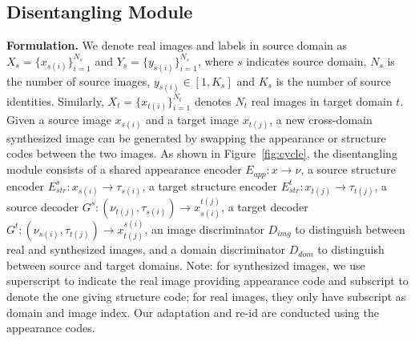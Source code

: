 \documentclass[runningheads]{llncs}
\begin{document}
\subsection{Disentangling Module}

\textbf{Formulation.} 
We denote real images and labels in source domain as $X_{s}=\{x_{s(i)}\}_{i=1}^{N_s}$ and $Y_{s} = \{y_{s(i)}\}_{i=1}^{N_{s}}$, where $s$ indicates source domain, $N_{s}$ is the number of source images, $y_{s(i)} \in [1,K_{s}]$ and $K_{s}$ is the number of source identities. Similarly, $X_{t}=\{x_{t(i)}\}_{i=1}^{N_{t}}$ denotes $N_t$ real images in target domain $t$. Given a source image $x_{s(i)}$ and a target image $x_{t(j)}$, a new cross-domain synthesized image can be generated by swapping the appearance or structure codes between the two images. As shown in Figure~\ref{fig:cycle}, the disentangling module consists of a shared appearance encoder $E_{app}: x \rightarrow \nu$, a source structure encoder $E_{str}^s: x_{s(i)} \rightarrow \tau_{s(i)}$, a target structure encoder $E_{str}^t: x_{t(j)} \rightarrow \tau_{t(j)}$, a source decoder $G^s: (\nu_{t(j)}, \tau_{s(i)}) \rightarrow x_{s(i)}^{t(j)}$, a target decoder $G^t: (\nu_{s(i)}, \tau_{t(j)}) \rightarrow x_{t(j)}^{s(i)}$, an image discriminator $D_{img}$ to distinguish between real and synthesized images, and a domain discriminator $D_{dom}$ to distinguish between source and target domains. Note: for synthesized images, we use superscript to indicate the real image providing appearance code and subscript to denote the one giving structure code; for real images, they only have subscript as domain and image index. 
Our adaptation and re-id are conducted using the appearance codes. 
\end{document}
